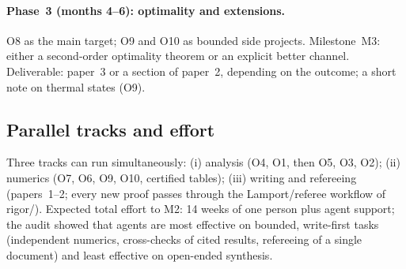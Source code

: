 \documentclass[11pt]{article}
\theoremstyle{accent}
\theoremstyle{definition}
\begin{document}
\paragraph{Phase~3 (months 4--6): optimality and extensions.}
O8 as the main target; O9 and O10 as bounded side projects.  Milestone~M3: either a second-order optimality theorem or an explicit better channel.  Deliverable: paper~3 or a section of paper~2, depending on the outcome; a short note on thermal states (O9).

\subsection{Parallel tracks and effort}
Three tracks can run simultaneously: (i) analysis (O4, O1, then O5, O3, O2); (ii) numerics (O7, O6, O9, O10, certified tables); (iii) writing and refereeing (papers~1--2; every new proof passes through the Lamport/referee workflow of rigor/).  Expected total effort to M2: 14 weeks of one person plus agent support; the audit showed that agents are most effective on bounded, write-first tasks (independent numerics, cross-checks of cited results, refereeing of a single document) and least effective on open-ended synthesis.
\end{document}
